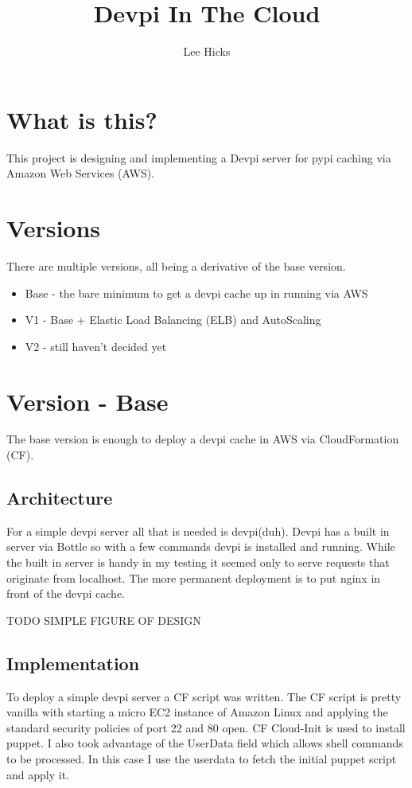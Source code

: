 \documentclass{article}
\begin{document}
\title{Devpi In The Cloud}
\author{Lee Hicks}

\maketitle

\section{What is this?}
This project is designing and implementing a Devpi server for pypi caching via Amazon Web Services (AWS).

\section{Versions}
There are multiple versions, all being a derivative of the base version.

\begin{itemize}
    \item Base - the bare minimum to get a devpi cache up in running via AWS 
    \item V1 - Base + Elastic Load Balancing (ELB) and AutoScaling
    \item V2 - still haven't decided yet
\end{itemize}

\section{Version - Base}
The base version is enough to deploy a devpi cache in AWS via CloudFormation (CF).

\subsection{Architecture}
For a simple devpi server all that is needed is devpi(duh). Devpi has a built in server via Bottle so with a few
commands devpi is installed and running. While the built in server is handy in my testing it seemed only to
serve requests that originate from localhost. The more permanent deployment is to put nginx in front of the
devpi cache.

TODO SIMPLE FIGURE OF DESIGN 

\subsection{Implementation}
To deploy a simple devpi server a CF script was written. The CF script
is pretty vanilla with starting a micro EC2 instance of Amazon Linux and applying the standard security policies of
port 22 and 80 open. CF Cloud-Init is used to install puppet. I also took advantage of the UserData field which
allows shell commands to be processed. In this case I use the userdata to fetch the initial puppet script and apply it.
\end{document}
